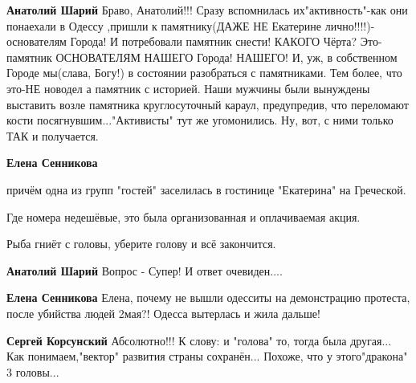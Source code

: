 \begin{itemize}
\begin{itemize}
\textbf{Анатолий Шарий} Браво, Анатолий!!! Сразу вспомнилась их"активность"-как
они понаехали в Одессу ,пришли к памятнику(ДАЖЕ НЕ Екатерине
лично!!!!)-основателям Города! И потребовали памятник снести! КАКОГО Чёрта?
Это-памятник ОСНОВАТЕЛЯМ НАШЕГО Города! НАШЕГО! И, уж, в собственном Городе
мы(слава, Богу!) в состоянии разобраться с памятниками. Тем более, что это-НЕ
новодел а памятник с историей. Наши мужчины были вынуждены выставить возле
памятника круглосуточный караул, предупредив, что переломают кости
посягнувшим..."Активисты" тут же угомонились. Ну, вот, с ними только ТАК и
получается.

 
\textbf{Елена Сенникова} 

причём одна из групп "гостей" заселилась в гостинице "Екатерина" на Греческой.

Где номера недешёвые, это была организованная и оплачиваемая акция.

Рыба гниёт с головы, уберите голову и всё закончится.

 
\textbf{Анатолий Шарий} Вопрос - Супер! И ответ очевиден....

 
\textbf{Елена Сенникова} Елена, почему не вышли одесситы на демонстрацию
протеста, после убийства людей 2мая?! Одесса вытерлась и жила дальше!

 
\textbf{Сергей Корсунский} Абсолютно!!! К слову: и "голова" то, тогда была
другая... Как понимаем,"вектор" развития страны сохранён... Похоже, что у
этого"дракона" 3 головы...


\end{itemize}
\end{itemize}
